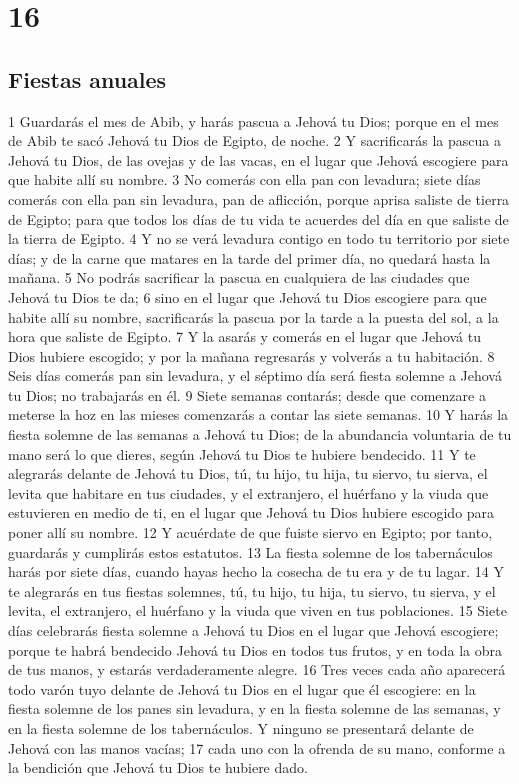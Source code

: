 \chapter{16}

\section{Fiestas anuales }

1 Guardarás el mes de Abib, y harás pascua  a Jehová tu Dios; porque en el mes de Abib te sacó Jehová tu Dios de Egipto, de noche.
2 Y sacrificarás la pascua a Jehová tu Dios, de las ovejas y de las vacas, en el lugar que Jehová escogiere para que habite allí su nombre.
3 No comerás con ella pan con levadura; siete días comerás con ella pan sin levadura, pan de aflicción, porque aprisa saliste de tierra de Egipto; para que todos los días de tu vida te acuerdes del día en que saliste de la tierra de Egipto.
4 Y no se verá levadura contigo en todo tu territorio por siete días; y de la carne que matares en la tarde del primer día, no quedará hasta la mañana.
5 No podrás sacrificar la pascua en cualquiera de las ciudades que Jehová tu Dios te da;
6 sino en el lugar que Jehová tu Dios escogiere para que habite allí su nombre, sacrificarás la pascua por la tarde a la puesta del sol, a la hora que saliste de Egipto.
7 Y la asarás y comerás en el lugar que Jehová tu Dios hubiere escogido; y por la mañana regresarás y volverás a tu habitación.
8 Seis días comerás pan sin levadura, y el séptimo día será fiesta solemne a Jehová tu Dios; no trabajarás en él.
9 Siete semanas contarás; desde que comenzare a meterse la hoz en las mieses comenzarás a contar las siete semanas.
10 Y harás la fiesta solemne de las semanas  a Jehová tu Dios; de la abundancia voluntaria de tu mano será lo que dieres, según Jehová tu Dios te hubiere bendecido.
11 Y te alegrarás delante de Jehová tu Dios, tú, tu hijo, tu hija, tu siervo, tu sierva, el levita que habitare en tus ciudades, y el extranjero, el huérfano y la viuda que estuvieren en medio de ti, en el lugar que Jehová tu Dios hubiere escogido para poner allí su nombre.
12 Y acuérdate de que fuiste siervo en Egipto; por tanto, guardarás y cumplirás estos estatutos.
13 La fiesta solemne de los tabernáculos harás por siete días, cuando hayas hecho la cosecha de tu era y de tu lagar.
14 Y te alegrarás en tus fiestas solemnes, tú, tu hijo, tu hija, tu siervo, tu sierva, y el levita, el extranjero, el huérfano y la viuda que viven en tus poblaciones.
15 Siete días celebrarás fiesta solemne a Jehová tu Dios en el lugar que Jehová escogiere; porque te habrá bendecido Jehová tu Dios en todos tus frutos, y en toda la obra de tus manos, y estarás verdaderamente alegre. 
16 Tres veces cada año aparecerá todo varón tuyo delante de Jehová tu Dios en el lugar que él escogiere: en la fiesta solemne de los panes sin levadura, y en la fiesta solemne de las semanas, y en la fiesta solemne de los tabernáculos. Y ninguno se presentará delante de Jehová con las manos vacías;
17 cada uno con la ofrenda de su mano, conforme a la bendición que Jehová tu Dios te hubiere dado.

